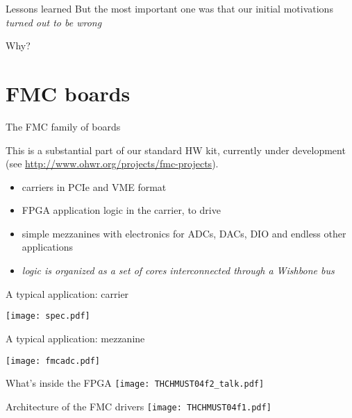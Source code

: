 \documentclass{beamer}
\begin{document}
\begin{frame}{Lessons learned}
But the most important one was that our initial motivations
\emph{turned out to be wrong}

\begin{center}
\Huge Why?
\end{center}
\end{frame}

\section{FMC boards}

\begin{frame}{The FMC family of boards}

This is a substantial part of our standard HW kit, currently under
development\\
(see \url{http://www.ohwr.org/projects/fmc-projects}).

\begin{itemize}
\item carriers in PCIe and VME format
\item FPGA application logic in the carrier, to drive
\item simple mezzanines with electronics for ADCs, DACs, DIO and endless
    other applications
\item \emph{logic is organized as a set of cores interconnected through a
    Wishbone bus}
\end{itemize}
\end{frame}

\begin{frame}{A typical application: carrier}
\begin{center}
\texttt{[image: spec.pdf]}
\end{center}
\end{frame}

\begin{frame}{A typical application: mezzanine}
\begin{center}
\texttt{[image: fmcadc.pdf]}
\end{center}
\end{frame}

\begin{frame}{What's inside the FPGA}
\texttt{[image: THCHMUST04f2\_talk.pdf]}
\end{frame}

\begin{frame}{Architecture of the FMC drivers}
\texttt{[image: THCHMUST04f1.pdf]}
\end{frame}
\end{document}
